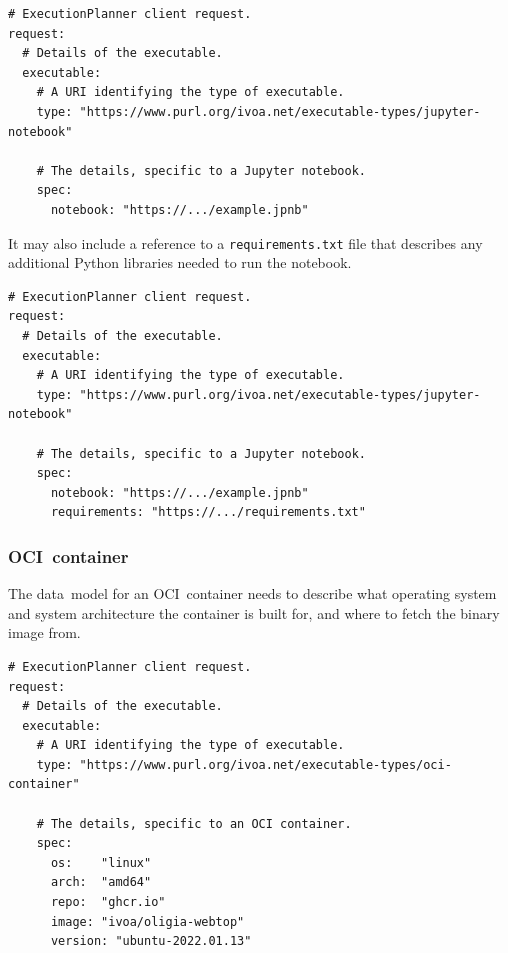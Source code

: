 \documentclass[11pt,a4paper]{ivoa}
\newcommand{\datamodel} {data~model}
\newcommand{\python} {Python}
\newcommand{\ocicontainer} {OCI~container}
\newcommand{\codeword}[1] {\texttt{#1}}
\begin{document}
\begin{lstlisting}[]
# ExecutionPlanner client request.
request:
  # Details of the executable.
  executable:
    # A URI identifying the type of executable.
    type: "https://www.purl.org/ivoa.net/executable-types/jupyter-notebook"

    # The details, specific to a Jupyter notebook.
    spec:
      notebook: "https://.../example.jpnb"
\end{lstlisting}

It may also include a reference to a \codeword{requirements.txt} file that describes any additional \python{}
libraries needed to run the notebook.
\begin{lstlisting}[]
# ExecutionPlanner client request.
request:
  # Details of the executable.
  executable:
    # A URI identifying the type of executable.
    type: "https://www.purl.org/ivoa.net/executable-types/jupyter-notebook"

    # The details, specific to a Jupyter notebook.
    spec:
      notebook: "https://.../example.jpnb"
      requirements: "https://.../requirements.txt"
\end{lstlisting}

\subsubsection{\ocicontainer{}}
\label{ocicontainer}
The \datamodel{} for an \ocicontainer{} needs to describe what operating system and system architecture
the container is built for, and where to fetch the binary image from.

\begin{lstlisting}[]
# ExecutionPlanner client request.
request:
  # Details of the executable.
  executable:
    # A URI identifying the type of executable.
    type: "https://www.purl.org/ivoa.net/executable-types/oci-container"

    # The details, specific to an OCI container.
    spec:
      os:    "linux"
      arch:  "amd64"
      repo:  "ghcr.io"
      image: "ivoa/oligia-webtop"
      version: "ubuntu-2022.01.13"
\end{lstlisting}
\end{document}
